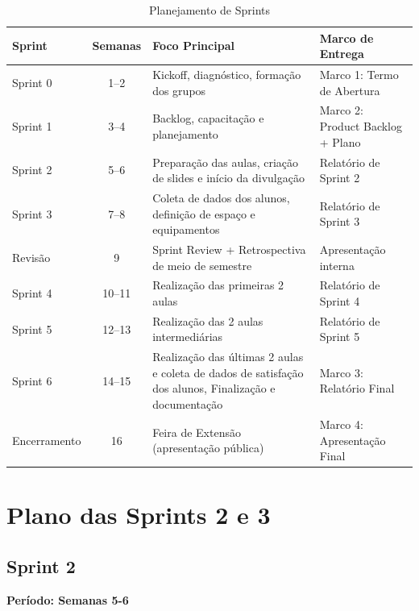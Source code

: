 \documentclass[12pt, a4paper]{article}
\begin{document}
\begin{table}[H]
\centering
\begin{tabular}{l c p{6cm} p{4cm}}
\toprule
\textbf{Sprint} & \textbf{Semanas} & \textbf{Foco Principal} & \textbf{Marco de Entrega} \\
\midrule

Sprint 0 & 1--2 & Kickoff, diagnóstico, formação dos grupos & Marco 1: Termo de Abertura \\

Sprint 1 & 3--4 & Backlog, capacitação e planejamento & Marco 2: Product Backlog + Plano \\

Sprint 2 & 5--6 & Preparação das aulas, criação de slides e início da divulgação & Relatório de Sprint 2 \\

Sprint 3 & 7--8 & Coleta de dados dos alunos, definição de espaço e equipamentos & Relatório de Sprint 3 \\

Revisão & 9 & Sprint Review + Retrospectiva de meio de semestre & Apresentação interna \\

Sprint 4 & 10--11 & Realização das primeiras 2 aulas & Relatório de Sprint 4 \\

Sprint 5 & 12--13 & Realização das 2 aulas intermediárias & Relatório de Sprint 5 \\

Sprint 6 & 14--15 &  Realização das últimas 2 aulas e coleta de dados de satisfação dos alunos, Finalização e documentação & Marco 3: Relatório Final \\

Encerramento & 16 & Feira de Extensão (apresentação pública) & Marco 4: Apresentação Final \\

\bottomrule
\end{tabular}
\caption{Planejamento de Sprints}
\end{table}

\section{Plano das Sprints 2 e 3}
\subsection{Sprint 2}
\textbf{Período: Semanas 5-6} \sprintperiodo \\
\end{document}
